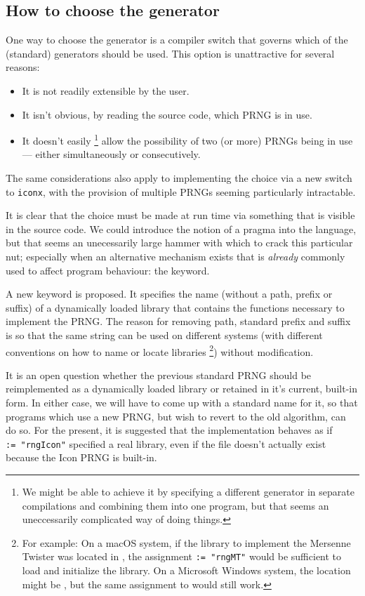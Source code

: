 \documentclass[letterpaper,12pt]{article}
\begin{document}
\subsection{How to choose the generator}
One way to choose the generator is a compiler switch that governs
which of the (standard) generators should be used. This option is
unattractive for several reasons:
\begin{itemize}
\item It is not readily extensible by the user.
\item It isn't obvious, by reading the source code, which PRNG is in use.
\item It doesn't easily%
  \footnote{
    We might be able to achieve it by specifying a different generator in
    separate compilations and combining them into one program, but that
    seems an uneccessarily complicated way of doing things.
    }
  allow the possibility of two (or more) PRNGs being in use --- either
  simultaneously or consecutively.
\end{itemize}
The same considerations also apply to implementing the choice via a new
switch to \texttt{iconx}, with the provision of multiple PRNGs seeming
particularly intractable.

It is clear that the choice must be made at run time via something that is
visible in the source code. We could introduce the notion of a pragma into
the language, but that seems an unecessarily large hammer with which to
crack this particular nut; especially when an alternative mechanism exists
that is {\em already} commonly used to affect program behaviour: the
keyword.

A new keyword \rndlibkwd is proposed. It specifies the name (without a
path, prefix or suffix)
of a dynamically loaded library that contains the functions necessary to
implement the PRNG. The reason for removing path, standard prefix and
suffix is so that the same string can be used on different systems (with
different conventions on how to name or locate libraries%
\footnote{
For example: On a macOS system, if the library to implement the Mersenne
Twister was located in , the
assignment \rndlibkwd\texttt{:=~"rngMT"} would be sufficient to load and
initialize the library. On a Microsoft Windows system, the location might be
, but the same assignment to
\rndlibkwd would still work.
}) without modification.

It is an open question whether the previous standard PRNG should be
reimplemented as a dynamically loaded library or retained in it's current,
built-in form. In either case, we will have to come up with a standard name
for it, so that programs which use a new PRNG, but wish to revert to the
old algorithm, can do so. For the present, it is suggested that the
implementation behaves as if \rndlibkwd\texttt{:=~"rngIcon"} specified a
real library, even if the file doesn't actually exist because the Icon PRNG
is built-in.
\end{document}
